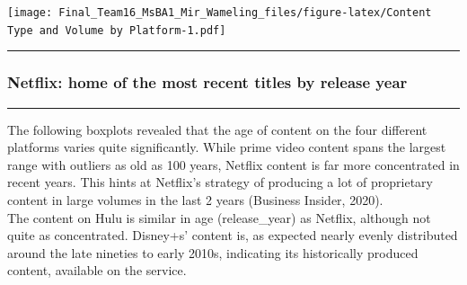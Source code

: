 \documentclass[
]{article}
\begin{document}
\texttt{[image: Final\_Team16\_MsBA1\_Mir\_Wameling\_files/figure-latex/Content Type and Volume by Platform-1.pdf]}

\begin{center}\rule{0.5\linewidth}{0.5pt}\end{center}

\hypertarget{netflix-home-of-the-most-recent-titles-by-release-year}{%
\subsubsection{Netflix: home of the most recent titles by release
year}\label{netflix-home-of-the-most-recent-titles-by-release-year}}

\begin{center}\rule{0.5\linewidth}{0.5pt}\end{center}

The following boxplots revealed that the age of content on the four
different platforms varies quite significantly. While prime video
content spans the largest range with outliers as old as 100 years,
Netflix content is far more concentrated in recent years. This hints at
Netflix's strategy of producing a lot of proprietary content in large
volumes in the last 2 years (Business Insider, 2020).\\
The content on Hulu is similar in age (release\_year) as Netflix,
although not quite as concentrated. Disney+s' content is, as expected
nearly evenly distributed around the late nineties to early 2010s,
indicating its historically produced content, available on the service.
\end{document}
